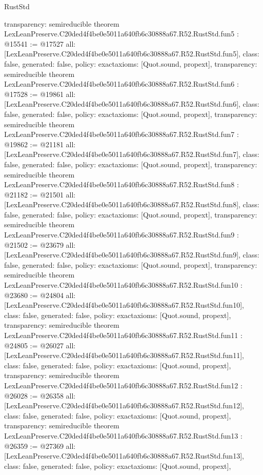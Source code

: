 \begin{lexlean}{RustStd}
\begin{coremodule}
{  transparency: semireducible
}
theorem LexLeanPreserve.C20ded4f4be0e5011a640fb6c30888a67.R52.RustStd.fun5 : @15541 := @17527 {
  all: [LexLeanPreserve.C20ded4f4be0e5011a640fb6c30888a67.R52.RustStd.fun5],
  class: false,
  generated: false,
  policy: exact{axioms: [Quot.sound, propext]},
  transparency: semireducible
}
theorem LexLeanPreserve.C20ded4f4be0e5011a640fb6c30888a67.R52.RustStd.fun6 : @17528 := @19861 {
  all: [LexLeanPreserve.C20ded4f4be0e5011a640fb6c30888a67.R52.RustStd.fun6],
  class: false,
  generated: false,
  policy: exact{axioms: [Quot.sound, propext]},
  transparency: semireducible
}
theorem LexLeanPreserve.C20ded4f4be0e5011a640fb6c30888a67.R52.RustStd.fun7 : @19862 := @21181 {
  all: [LexLeanPreserve.C20ded4f4be0e5011a640fb6c30888a67.R52.RustStd.fun7],
  class: false,
  generated: false,
  policy: exact{axioms: [Quot.sound, propext]},
  transparency: semireducible
}
theorem LexLeanPreserve.C20ded4f4be0e5011a640fb6c30888a67.R52.RustStd.fun8 : @21182 := @21501 {
  all: [LexLeanPreserve.C20ded4f4be0e5011a640fb6c30888a67.R52.RustStd.fun8],
  class: false,
  generated: false,
  policy: exact{axioms: [Quot.sound, propext]},
  transparency: semireducible
}
theorem LexLeanPreserve.C20ded4f4be0e5011a640fb6c30888a67.R52.RustStd.fun9 : @21502 := @23679 {
  all: [LexLeanPreserve.C20ded4f4be0e5011a640fb6c30888a67.R52.RustStd.fun9],
  class: false,
  generated: false,
  policy: exact{axioms: [Quot.sound, propext]},
  transparency: semireducible
}
theorem LexLeanPreserve.C20ded4f4be0e5011a640fb6c30888a67.R52.RustStd.fun10 : @23680 := @24804 {
  all: [LexLeanPreserve.C20ded4f4be0e5011a640fb6c30888a67.R52.RustStd.fun10],
  class: false,
  generated: false,
  policy: exact{axioms: [Quot.sound, propext]},
  transparency: semireducible
}
theorem LexLeanPreserve.C20ded4f4be0e5011a640fb6c30888a67.R52.RustStd.fun11 : @24805 := @26027 {
  all: [LexLeanPreserve.C20ded4f4be0e5011a640fb6c30888a67.R52.RustStd.fun11],
  class: false,
  generated: false,
  policy: exact{axioms: [Quot.sound, propext]},
  transparency: semireducible
}
theorem LexLeanPreserve.C20ded4f4be0e5011a640fb6c30888a67.R52.RustStd.fun12 : @26028 := @26358 {
  all: [LexLeanPreserve.C20ded4f4be0e5011a640fb6c30888a67.R52.RustStd.fun12],
  class: false,
  generated: false,
  policy: exact{axioms: [Quot.sound, propext]},
  transparency: semireducible
}
theorem LexLeanPreserve.C20ded4f4be0e5011a640fb6c30888a67.R52.RustStd.fun13 : @26359 := @27369 {
  all: [LexLeanPreserve.C20ded4f4be0e5011a640fb6c30888a67.R52.RustStd.fun13],
  class: false,
  generated: false,
  policy: exact{axioms: [Quot.sound, propext]},
}
\end{coremodule}
\end{lexlean}
